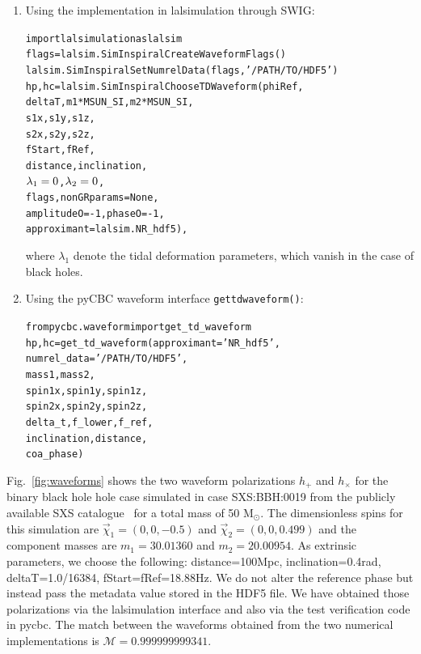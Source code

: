 \documentclass[11pt,tightenlines,article,amssymb,amsmath,amsfonts,superscriptaddress]{revtex4}
\begin{document}
\begin{enumerate}

\item Using the implementation in lalsimulation through SWIG:
\begin{alltt}
import lalsimulation as lalsim
flags = lalsim.SimInspiralCreateWaveformFlags()
lalsim.SimInspiralSetNumrelData(flags,'/PATH/TO/HDF5')
hp, hc = lalsim.SimInspiralChooseTDWaveform(phiRef, 
              deltaT, m1 * MSUN_SI, m2 * MSUN_SI, 
              s1x, s1y, s1z,
              s2x, s2y, s2z, 
              fStart, fRef, 
              distance, inclination,
              \(\lambda\sb{1}=0\), \(\lambda\sb{2}=0\), 
              flags, nonGRparams=None, 
              amplitudeO=-1, phaseO=-1, 
              approximant=lalsim.NR_hdf5),
\end{alltt}
where $\lambda_1$ denote the tidal deformation parameters, which vanish in the case of black holes. 

\item Using the pyCBC waveform interface \texttt{get\textunderscore td\textunderscore waveform()}:
\begin{alltt}
from pycbc.waveform import get_td_waveform 
hp, hc = get_td_waveform(approximant='NR_hdf5', 
                         numrel_data='/PATH/TO/HDF5',
                         mass1, mass2,
                         spin1x, spin1y, spin1z,
                         spin2x, spin2y, spin2z, 
                         delta_t, f_lower, f_ref,
                         inclination, distance, 
                         coa_phase)
\end{alltt}
\end{enumerate}
Fig.~\ref{fig:waveforms} shows the two waveform polarizations $h_+$ and $h_{\times}$ for the binary black hole hole case simulated in case 
SXS:BBH:0019 from the publicly available SXS catalogue~\cite{Mroue:2013xna} for a total mass of 50 $\mathrm{M}_\odot$. The dimensionless spins for this simulation are
$\vec{\chi}_1=(0,0,-0.5)$ and $\vec{\chi}_2=(0,0,0.499)$ and the component masses are $m_1=30.01360$ and $m_2=20.00954$.
As extrinsic parameters, we choose the following: distance=100Mpc, inclination=0.4rad, deltaT=1.0/16384, fStart=fRef=18.88Hz. We do not alter
the reference phase but instead pass the metadata value stored in the HDF5 file. We have obtained those polarizations via the lalsimulation interface and also via the test verification code in pycbc. The match between the waveforms obtained from the two numerical implementations is $\mathcal{M}=0.999999999341$.
\end{document}

